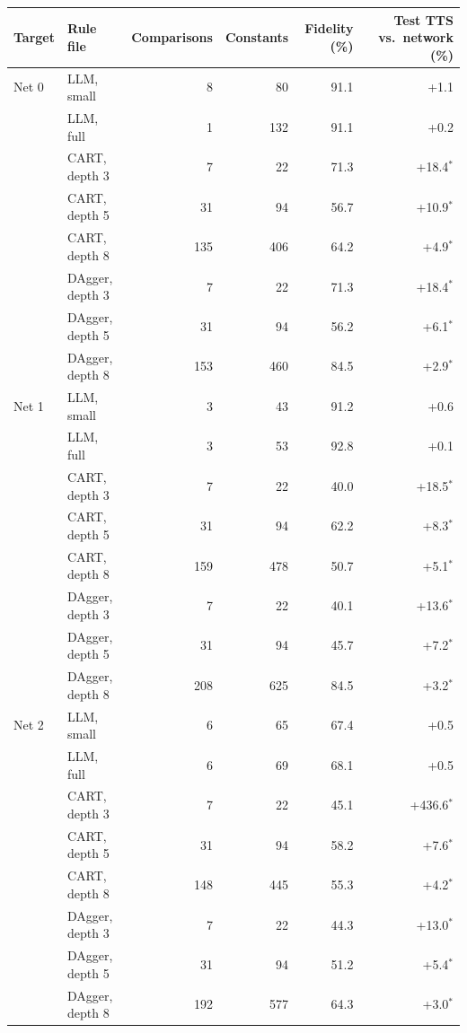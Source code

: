 \begin{tabular}{llrrrr}
\toprule
Target & Rule file & Comparisons & Constants & Fidelity (\%) & Test TTS vs.\ network (\%) \\
\midrule
Net 0 & LLM, small & 8 & 80 & 91.1 & +1.1 \\
 & LLM, full & 1 & 132 & 91.1 & +0.2 \\
 & CART, depth 3 & 7 & 22 & 71.3 & +18.4$^{*}$ \\
 & CART, depth 5 & 31 & 94 & 56.7 & +10.9$^{*}$ \\
 & CART, depth 8 & 135 & 406 & 64.2 & +4.9$^{*}$ \\
 & DAgger, depth 3 & 7 & 22 & 71.3 & +18.4$^{*}$ \\
 & DAgger, depth 5 & 31 & 94 & 56.2 & +6.1$^{*}$ \\
 & DAgger, depth 8 & 153 & 460 & 84.5 & +2.9$^{*}$ \\
\midrule
Net 1 & LLM, small & 3 & 43 & 91.2 & +0.6 \\
 & LLM, full & 3 & 53 & 92.8 & +0.1 \\
 & CART, depth 3 & 7 & 22 & 40.0 & +18.5$^{*}$ \\
 & CART, depth 5 & 31 & 94 & 62.2 & +8.3$^{*}$ \\
 & CART, depth 8 & 159 & 478 & 50.7 & +5.1$^{*}$ \\
 & DAgger, depth 3 & 7 & 22 & 40.1 & +13.6$^{*}$ \\
 & DAgger, depth 5 & 31 & 94 & 45.7 & +7.2$^{*}$ \\
 & DAgger, depth 8 & 208 & 625 & 84.5 & +3.2$^{*}$ \\
\midrule
Net 2 & LLM, small & 6 & 65 & 67.4 & +0.5 \\
 & LLM, full & 6 & 69 & 68.1 & +0.5 \\
 & CART, depth 3 & 7 & 22 & 45.1 & +436.6$^{*}$ \\
 & CART, depth 5 & 31 & 94 & 58.2 & +7.6$^{*}$ \\
 & CART, depth 8 & 148 & 445 & 55.3 & +4.2$^{*}$ \\
 & DAgger, depth 3 & 7 & 22 & 44.3 & +13.0$^{*}$ \\
 & DAgger, depth 5 & 31 & 94 & 51.2 & +5.4$^{*}$ \\
 & DAgger, depth 8 & 192 & 577 & 64.3 & +3.0$^{*}$ \\
\bottomrule
\end{tabular}
